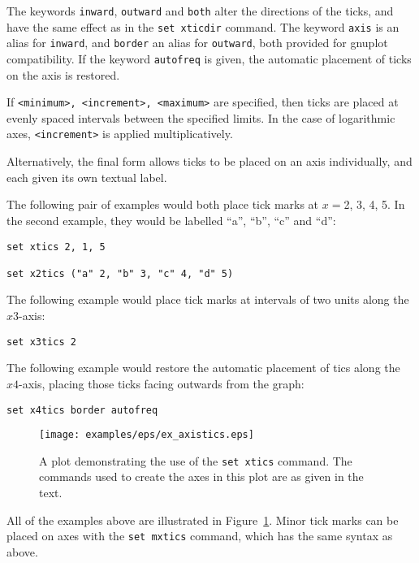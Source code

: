 \documentclass[a4paper,onecolumn,11pt]{book}
\begin{document}
The keywords \texttt{inward}, \texttt{outward} and \texttt{both} alter the
directions of the ticks, and have the same effect as in the \texttt{set
xticdir} command. The keyword \texttt{axis} is an alias for \texttt{inward},
and \texttt{border} an alias for \texttt{outward}, both provided for gnuplot
compatibility. If the keyword \texttt{autofreq} is given, the automatic
placement of ticks on the axis is restored.

If \texttt{<minimum>, <increment>, <maximum>} are specified, then ticks are
placed at evenly spaced intervals between the specified limits. In the case of
logarithmic axes, \texttt{<increment>} is applied multiplicatively.

Alternatively, the final form allows ticks to be placed on an axis
individually, and each given its own textual label.

The following pair of examples would both place tick marks at $x=$2, 3, 4, 5.
In the second example, they would be labelled ``a'', ``b'', ``c'' and ``d'':

\begin{verbatim}
set xtics 2, 1, 5

set x2tics ("a" 2, "b" 3, "c" 4, "d" 5)
\end{verbatim}

The following example would place tick marks at intervals of two units along
the $x3$-axis:

\begin{verbatim}
set x3tics 2
\end{verbatim}

The following example would restore the automatic placement of tics along the
$x4$-axis, placing those ticks facing outwards from the graph:

\begin{verbatim}
set x4tics border autofreq
\end{verbatim}

\begin{figure}
\begin{center}
\texttt{[image: examples/eps/ex\_axistics.eps]}
\end{center}
\caption{A plot demonstrating the use of the {\tt set xtics} command. The commands used to create the axes in this plot are as given in the text.}
\label{fig:ex_axistics}
\end{figure}


All of the examples above are illustrated in Figure~\ref{fig:ex_axistics}.
Minor tick marks can be placed on axes with the \texttt{set mxtics} command,
which has the same syntax as above.
\end{document}
